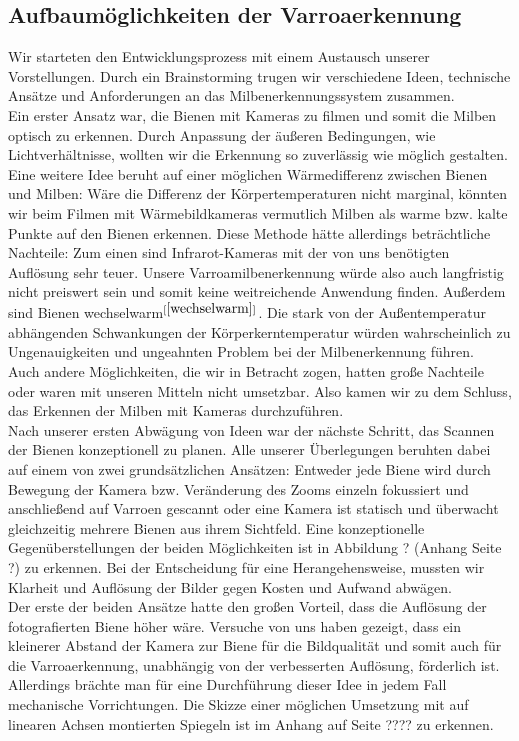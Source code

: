 \documentclass[11pt,a4paper]{article}
\newcommand{\bibRef}[1]{\hyperlink{#1}{$^{[\ref*{#1}{}]}$}}
\begin{document}
\subsection{Aufbaumöglichkeiten der Varroaerkennung}
Wir starteten den Entwicklungsprozess mit einem Austausch unserer Vorstellungen. Durch ein Brainstorming trugen wir verschiedene Ideen, technische Ansätze und Anforderungen an das Milbenerkennungssystem zusammen. \\
Ein erster Ansatz war, die Bienen mit Kameras zu filmen und somit die Milben optisch zu erkennen. Durch Anpassung der äußeren Bedingungen, wie Lichtverhältnisse, wollten wir die Erkennung so zuverlässig wie möglich gestalten.\\
Eine weitere Idee beruht auf einer möglichen Wärmedifferenz zwischen Bienen und Milben: Wäre die Differenz der Körpertemperaturen nicht marginal, könnten wir beim Filmen mit Wärmebildkameras vermutlich Milben als warme bzw. kalte Punkte auf den Bienen erkennen. Diese Methode hätte allerdings beträchtliche Nachteile: Zum einen sind Infrarot-Kameras mit der von uns benötigten Auflösung sehr teuer. Unsere Varroamilbenerkennung würde also auch langfristig nicht preiswert sein und somit keine weitreichende Anwendung finden. Außerdem sind Bienen wechselwarm\bibRef{wechselwarm}. Die stark von der Außentemperatur abhängenden Schwankungen der Körperkerntemperatur würden wahrscheinlich zu Ungenauigkeiten und ungeahnten Problem bei der Milbenerkennung führen.\\
Auch andere Möglichkeiten, die wir in Betracht zogen, hatten große Nachteile oder waren mit unseren Mitteln nicht umsetzbar. Also kamen wir zu dem Schluss, das Erkennen der Milben mit Kameras durchzuführen.\\
Nach unserer ersten Abwägung von Ideen war der nächste Schritt, das Scannen der Bienen konzeptionell zu planen. Alle unserer Überlegungen beruhten dabei auf einem von zwei grundsätzlichen Ansätzen: Entweder jede Biene wird durch Bewegung der Kamera bzw. Veränderung des Zooms einzeln fokussiert und anschließend auf Varroen gescannt oder eine Kamera ist statisch und überwacht gleichzeitig mehrere Bienen aus ihrem Sichtfeld. Eine konzeptionelle Gegenüberstellungen der beiden Möglichkeiten ist in Abbildung ? (Anhang Seite ?) zu erkennen. Bei der Entscheidung für eine Herangehensweise, mussten wir Klarheit und Auflösung der Bilder gegen Kosten und Aufwand abwägen.\\
Der erste der beiden Ansätze hatte den großen Vorteil, dass die Auflösung der fotografierten Biene höher wäre. Versuche von uns haben gezeigt, dass ein kleinerer Abstand der Kamera zur Biene für die Bildqualität und somit auch für die Varroaerkennung, unabhängig von der verbesserten Auflösung, förderlich ist. Allerdings brächte man für eine Durchführung dieser Idee in jedem Fall mechanische Vorrichtungen. Die Skizze einer möglichen Umsetzung mit auf linearen Achsen montierten Spiegeln ist im Anhang auf Seite ???? zu erkennen.\\
\end{document}
